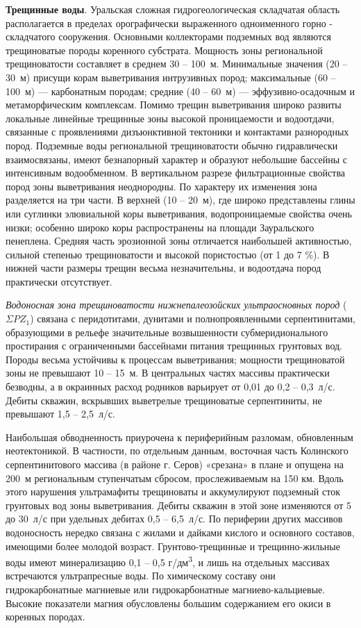 \textbf{Трещинные воды}. Уральская сложная гидрогеологическая складчатая область располагается в пределах орографически выраженного одноименного горно - складчатого сооружения. Основными коллекторами подземных вод являются трещиноватые породы коренного субстрата. Мощность зоны региональной трещиноватости составляет в среднем 30  --  100~м. Минимальные значения (20  --  30~м) присущи корам выветривания интрузивных пород; максимальные (60  --  100~м)  ---  карбонатным породам; средние (40  --  60~м)  ---  эффузивно-осадочным и метаморфическим комплексам. Помимо трещин выветривания широко развиты локальные линейные трещинные зоны высокой проницаемости и водоотдачи, связанные с проявлениями дизъюнктивной тектоники и контактами разнородных пород. Подземные воды региональной трещиноватости обычно гидравлически взаимосвязаны, имеют безнапорный характер и образуют небольшие бассейны с интенсивным водообменном. В вертикальном разрезе фильтрационные свойства пород зоны выветривания неоднородны. По характеру их изменения зона разделяется на три части. В верхней (10  --  20~м), где широко представлены глины или суглинки элювиальной коры выветривания, водопроницаемые свойства очень низки; особенно широко коры распространены на площади Зауральского пенеплена. Средняя часть эрозионной зоны отличается наибольшей активностью, сильной степенью трещиноватости и высокой пористостью (от 1 до 7 \%). В нижней части размеры трещин весьма незначительны, и водоотдача пород практически отсутствует.

\textit{Водоносная зона трещиноватости нижнепалеозойских ультраосновных пород} ($\Sigma PZ_1$)
связана с перидотитами, дунитами и полнопроявленными серпентинитами, образующими в рельефе значительные возвышенности субмеридионального простирания с ограниченными бассейнами питания трещинных грунтовых вод. Породы весьма устойчивы к процессам выветривания; мощности трещиноватой зоны не превышают 10  --  15~м. В центральных частях массивы практически безводны, а в окраинных расход родников варьирует от 0,01 до 0,2  --  0,3~л/с. Дебиты скважин, вскрывших выветрелые трещиноватые серпентиниты, не превышают 1,5 -- 2,5~л/с.

Наибольшая обводненность приурочена к периферийным разломам, обновленным неотектоникой. В частности, по отдельным данным, восточная часть Колинского серпентинитового массива (в районе г. Серов) «срезана» в плане и опущена на 200~м региональным ступенчатым сбросом, прослеживаемым на 150 км. Вдоль этого нарушения ультрамафиты трещиноваты и аккумулируют подземный сток грунтовых вод зоны выветривания. Дебиты
скважин в этой зоне изменяются от 5 до 30~л/с при удельных дебитах 0,5  --  6,5~л/с. По периферии других массивов водоносность нередко связана с жилами и дайками кислого и основного составов, имеющими более молодой возраст. Грунтово-трещинные и трещинно-жильные воды имеют минерализацию 0,1 -- 0,5 г/дм\textsuperscript{3}, и лишь на отдельных массивах встречаются ультрапресные воды. По химическому составу они гидрокарбонатные магниевые или гидрокарбонатные магниево-кальциевые. Высокие показатели магния обусловлены большим содержанием его окиси в коренных породах.


